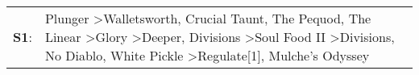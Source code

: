\begin{supertabular}{p{0.03\textwidth}p{0.92\textwidth}}
 \textbf{S1}:  &  Plunger\textsuperscript{} \textgreater \enspace Walletsworth\textsuperscript{}, \enspace Crucial Taunt\textsuperscript{}, \enspace The Pequod\textsuperscript{}, \enspace The Linear\textsuperscript{} \textgreater \enspace Glory\textsuperscript{} \textgreater \enspace Deeper\textsuperscript{}, \enspace Divisions\textsuperscript{} \textgreater \enspace Soul Food II\textsuperscript{} \textgreater \enspace Divisions\textsuperscript{}, \enspace No Diablo\textsuperscript{}, \enspace White Pickle\textsuperscript{} \textgreater \enspace Regulate[1]\textsuperscript{}, \enspace Mulche's Odyssey\textsuperscript{}  \enspace  \\
\end{supertabular}

